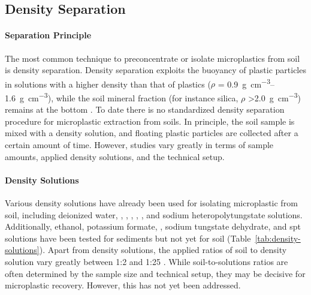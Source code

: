 \subsection{Density Separation}
\label{sec:analytical-techniques:density-separation}

\paragraph{Separation Principle}

The most common technique to preconcentrate or isolate microplastics from soil is density separation. Density separation exploits the buoyancy of plastic particles in solutions with a higher density than that of plastics ($\rho$ = \SIrange{0.9}{1.6}{\gram\per\cubic\centi\meter}),
while the soil mineral fraction (for instance silica, $\rho$ \SI{>2.0}{\gram\per\cubic\centi\meter}) remains at the bottom \citep{EndersEvaluation2020,LiuAnalytical2020}. To date there is no standardized density separation procedure for microplastic extraction from soils. In principle, the soil sample is mixed with a density solution, and floating plastic particles are collected after a certain amount of time. However, studies vary greatly in terms of sample amounts, applied density solutions, and the technical setup.

\paragraph{Density Solutions}

Various density solutions have already been used for isolating microplastic from soil, including deionized water, , ,  , , ,
and sodium heteropolytungstate solutions. Additionally, ethanol, potassium formate,
, sodium tungstate dehydrate, and \ac{spt} solutions have been tested for sediments but not yet for soil
(Table~\ref{tab:density-solutions}). Apart from density solutions, the applied ratios of soil to density solution vary greatly between 1:2 \citep{ChenMixing2020} and 1:25 \citep{ZubrisSynthetic2005}.
While soil-to-solutions ratios are often determined by the sample size and technical setup, they may be decisive for microplastic recovery.
However, this has not yet been addressed.

